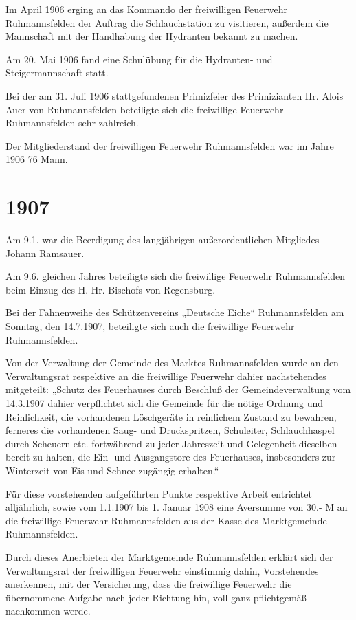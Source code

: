 \documentclass[12pt,a4paper]{book}
\begin{document}
Im April 1906 erging an das Kommando der freiwilligen Feuerwehr Ruhmannsfelden
der Auftrag die Schlauchstation zu visitieren, außerdem die Mannschaft mit der
Handhabung der Hydranten bekannt zu machen.

Am 20. Mai 1906 fand eine Schulübung für die Hydranten- und Steigermannschaft
statt.

Bei der am 31. Juli 1906 stattgefundenen Primizfeier des Primizianten Hr. Alois
Auer von Ruhmannsfelden beteiligte sich die freiwillige Feuerwehr Ruhmannsfelden
sehr zahlreich.

Der Mitgliederstand der freiwilligen Feuerwehr Ruhmannsfelden war im Jahre 1906
76 Mann.

\section*{1907}

Am 9.1. war die Beerdigung des langjährigen außerordentlichen Mitgliedes Johann
Ramsauer.

Am 9.6. gleichen Jahres beteiligte sich die freiwillige Feuerwehr Ruhmannsfelden
beim Einzug des H. Hr. Bischofs von Regensburg.

Bei der Fahnenweihe des Schützenvereins „Deutsche Eiche“ Ruhmannsfelden am
Sonntag, den 14.7.1907, beteiligte sich auch die freiwillige Feuerwehr
Ruhmannsfelden.

Von der Verwaltung der Gemeinde des Marktes Ruhmannsfelden wurde an den
Verwaltungsrat respektive an die freiwillige Feuerwehr dahier nachstehendes
mitgeteilt: „Schutz des Feuerhauses durch Beschluß der Gemeindeverwaltung vom
14.3.1907 dahier verpflichtet sich die Gemeinde für die nötige Ordnung und
Reinlichkeit, die vorhandenen Löschgeräte in reinlichem Zustand zu bewahren,
ferneres die vorhandenen Saug- und Druckspritzen, Schuleiter, Schlauchhaspel
durch Scheuern etc. fortwährend zu jeder Jahreszeit und Gelegenheit dieselben
bereit zu halten, die Ein- und Ausgangstore des Feuerhauses, insbesonders zur
Winterzeit von Eis und Schnee zugängig erhalten.“

Für diese vorstehenden aufgeführten Punkte respektive Arbeit entrichtet
alljährlich, sowie vom 1.1.1907 bis 1. Januar 1908 eine Aversumme von 30.- M an
die freiwillige Feuerwehr Ruhmannsfelden aus der Kasse des Marktgemeinde
Ruhmannsfelden.

Durch dieses Anerbieten der Marktgemeinde Ruhmannsfelden erklärt sich der
Verwaltungsrat der freiwilligen Feuerwehr einstimmig dahin, Vorstehendes
anerkennen, mit der Versicherung, dass die freiwillige Feuerwehr die übernommene
Aufgabe nach jeder Richtung hin, voll ganz pflichtgemäß nachkommen werde.
\end{document}
